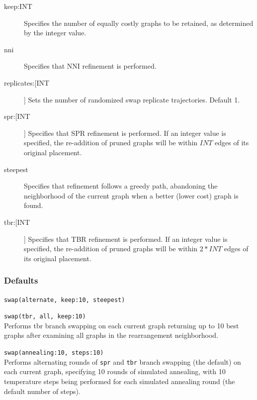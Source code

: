 \begin{description}
		
				
		\item[keep:INT] Specifies the number of equally costly graphs to be retained, as
		determined by the integer value.		
		
		\item[nni] Specifies that NNI refinement \citep{CaminandSokal1965, Robinson1971} 
		is performed.
		
		\item[replicates:[INT]] Sets the number of randomized swap replicate trajectories. 
		Default 1.
		
		
		\item[spr:[INT]] Specifies that SPR refinement \citep{Dayhoff1969} is performed. If an 
		integer value is specified, the re-addition of pruned graphs will be within $INT$ 
		edges of its original placement.
		
		\item[steepest] Specifies that refinement follows a greedy path, abandoning the 
		neighborhood of the current graph when a better (lower cost) graph is found.  		
		
		\item[tbr:[INT]] Specifies that TBR refinement \citep{Farris1988, swofford1990a} 
		is performed. If an integer value is specified, the re-addition of pruned graphs 
		will be within $2 * INT$ edges of its original placement.
		
	\end{description}	
		
		\subsubsection{Defaults}
			\texttt{swap(alternate, keep:10, steepest)}
		
		\begin{example}
		
			\item{\texttt{swap(tbr, all, keep:10)}\\Performs tbr branch swapping on each current graph 
			returning up to 10 best graphs after examining all graphs in 
			the rearrangement neighborhood.}
			
			\item{\texttt{swap(annealing:10, steps:10)}\\Performs alternating rounds of \texttt{spr} and 
			\texttt{tbr} branch swapping (the default) on each current graph, specifying 10 rounds of
			simulated annealing, with 10 temperature steps being performed for each
			simulated annealing round (the default number of steps).}
			
		\end{example}
	
